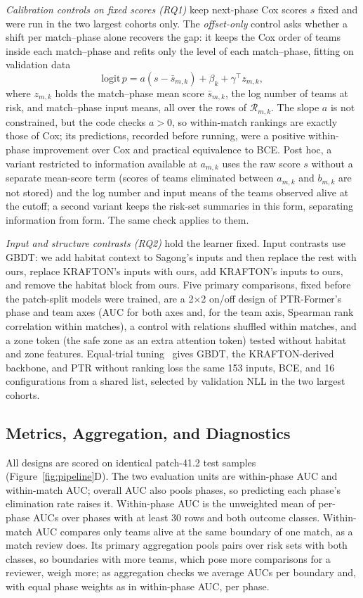 \documentclass[sigconf,anonymous]{acmart}
\begin{document}
\emph{Calibration controls on fixed scores (RQ1)} keep next-phase Cox scores $s$ fixed and were run in the two largest cohorts only. The \emph{offset-only} control asks whether a shift per match--phase alone recovers the gap: it keeps the Cox order of teams inside each match--phase and refits only the level of each match--phase, fitting on validation data
\begin{equation}
\mathrm{logit}\,p=a(s-\bar s_{m,k})+\beta_k+\gamma^{\top}z_{m,k},
\label{eq:offset}
\end{equation}
where $z_{m,k}$ holds the match--phase mean score $\bar s_{m,k}$, the log number of teams at risk, and match--phase input means, all over the rows of $\mathcal{R}_{m,k}$. The slope $a$ is not constrained, but the code checks $a>0$, so within-match rankings are exactly those of Cox; its predictions, recorded before running, were a positive within-phase improvement over Cox and practical equivalence to BCE. Post hoc, a variant restricted to information available at $a_{m,k}$ uses the raw score $s$ without a separate mean-score term (scores of teams eliminated between $a_{m,k}$ and $b_{m,k}$ are not stored) and the log number and input means of the teams observed alive at the cutoff; a second variant keeps the risk-set summaries in this form, separating information from form. The same check applies to them.

\emph{Input and structure contrasts (RQ2)} hold the learner fixed. Input contrasts use GBDT: we add habitat context to Sagong's inputs and then replace the rest with ours, replace KRAFTON's inputs with ours, add KRAFTON's inputs to ours, and remove the habitat block from ours. Five primary comparisons, fixed before the patch-split models were trained, are a 2$\times$2 on/off design of PTR-Former's phase and team axes (AUC for both axes and, for the team axis, Spearman rank correlation within matches), a control with relations shuffled within matches, and a zone token (the safe zone as an extra attention token) tested without habitat and zone features. Equal-trial tuning~\cite{Bergstra12,Cawley10} gives GBDT, the KRAFTON-derived backbone, and PTR without ranking loss the same 153 inputs, BCE, and 16 configurations from a shared list, selected by validation NLL in the two largest cohorts.

\subsection{Metrics, Aggregation, and Diagnostics}
\label{sec:method:units}
All designs are scored on identical patch-41.2 test samples (Figure~\ref{fig:pipeline}D). The two evaluation units are within-phase AUC and within-match AUC; overall AUC also pools phases, so predicting each phase's elimination rate raises it. Within-phase AUC is the unweighted mean of per-phase AUCs over phases with at least 30 rows and both outcome classes. Within-match AUC compares only teams alive at the same boundary of one match, as a match review does. Its primary aggregation pools pairs over risk sets with both classes, so boundaries with more teams, which pose more comparisons for a reviewer, weigh more; as aggregation checks we average AUCs per boundary and, with equal phase weights as in within-phase AUC, per phase.
\end{document}

